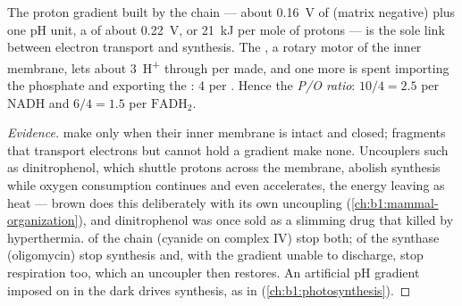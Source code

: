 \begin{theorem}\label{thm:b1:respiration-fermentation:chemiosmosis}
The proton gradient built by the chain --- about \qty{0.16}{V} of
 (matrix negative) plus one pH unit, a
\emph{} of about \qty{0.22}{V}, or \qty{21}{kJ} per
mole of protons --- is the sole link between electron transport and
 synthesis. The , a rotary motor of the inner membrane,
lets about \qty{3}{H^+} through per  made, and one more is spent
importing the phosphate and exporting the : 4 per . Hence the
\emph{P/O ratio}: $10/4 = 2.5$  per NADH and
$6/4 = 1.5$ per $\mathrm{FADH_2}$.
\end{theorem}
\begin{proof}[Evidence]
 make  only when their inner membrane is intact and
closed; fragments that transport electrons but cannot hold a gradient
make none. Uncouplers such as dinitrophenol, which shuttle protons
across the membrane, abolish  synthesis while oxygen consumption
continues and even accelerates, the energy leaving as heat --- brown 
does this deliberately with its own uncoupling 
(\cref{ch:b1:mammal-organization}), and dinitrophenol was once sold as
a slimming drug that killed by hyperthermia.  of the chain
(cyanide on complex IV) stop both;  of the synthase
(oligomycin) stop  synthesis and, with the gradient unable to
discharge, stop respiration too, which an uncoupler then restores. An
artificial pH gradient imposed on  in the dark drives 
synthesis, as in  (\cref{ch:b1:photosynthesis}).
\end{proof}


